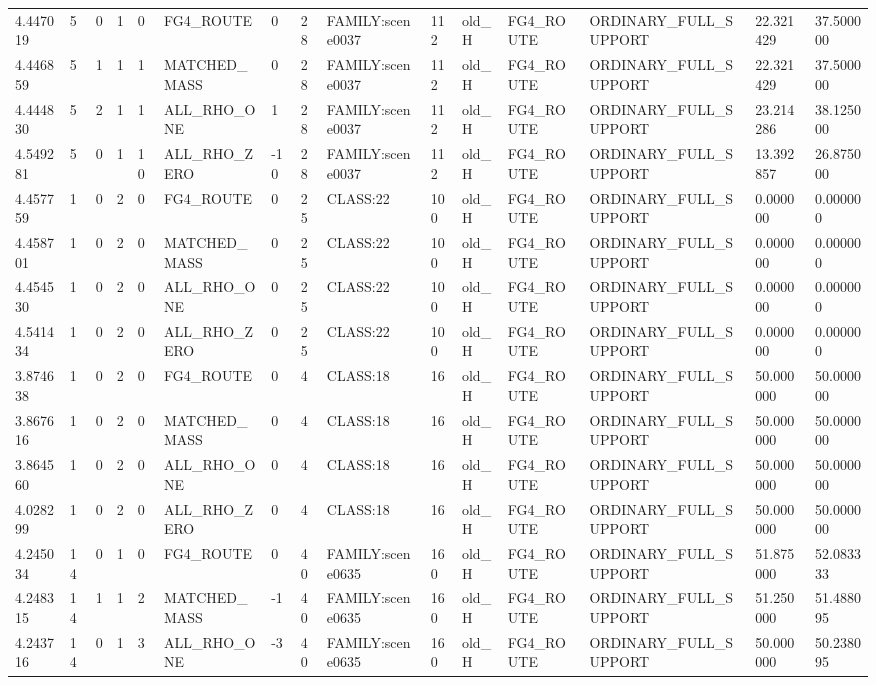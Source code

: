 \begin{tabular}{lllllllllllllll}
4.447019 & 5 & 0 & 1 & 0 & FG4\_ROUTE & 0 & 28 & FAMILY:scene0037 & 112 & old\_H & FG4\_ROUTE & ORDINARY\_FULL\_SUPPORT & 22.321429 & 37.500000 \\
4.446859 & 5 & 1 & 1 & 1 & MATCHED\_MASS & 0 & 28 & FAMILY:scene0037 & 112 & old\_H & FG4\_ROUTE & ORDINARY\_FULL\_SUPPORT & 22.321429 & 37.500000 \\
4.444830 & 5 & 2 & 1 & 1 & ALL\_RHO\_ONE & 1 & 28 & FAMILY:scene0037 & 112 & old\_H & FG4\_ROUTE & ORDINARY\_FULL\_SUPPORT & 23.214286 & 38.125000 \\
4.549281 & 5 & 0 & 1 & 10 & ALL\_RHO\_ZERO & -10 & 28 & FAMILY:scene0037 & 112 & old\_H & FG4\_ROUTE & ORDINARY\_FULL\_SUPPORT & 13.392857 & 26.875000 \\
4.457759 & 1 & 0 & 2 & 0 & FG4\_ROUTE & 0 & 25 & CLASS:22 & 100 & old\_H & FG4\_ROUTE & ORDINARY\_FULL\_SUPPORT & 0.000000 & 0.000000 \\
4.458701 & 1 & 0 & 2 & 0 & MATCHED\_MASS & 0 & 25 & CLASS:22 & 100 & old\_H & FG4\_ROUTE & ORDINARY\_FULL\_SUPPORT & 0.000000 & 0.000000 \\
4.454530 & 1 & 0 & 2 & 0 & ALL\_RHO\_ONE & 0 & 25 & CLASS:22 & 100 & old\_H & FG4\_ROUTE & ORDINARY\_FULL\_SUPPORT & 0.000000 & 0.000000 \\
4.541434 & 1 & 0 & 2 & 0 & ALL\_RHO\_ZERO & 0 & 25 & CLASS:22 & 100 & old\_H & FG4\_ROUTE & ORDINARY\_FULL\_SUPPORT & 0.000000 & 0.000000 \\
3.874638 & 1 & 0 & 2 & 0 & FG4\_ROUTE & 0 & 4 & CLASS:18 & 16 & old\_H & FG4\_ROUTE & ORDINARY\_FULL\_SUPPORT & 50.000000 & 50.000000 \\
3.867616 & 1 & 0 & 2 & 0 & MATCHED\_MASS & 0 & 4 & CLASS:18 & 16 & old\_H & FG4\_ROUTE & ORDINARY\_FULL\_SUPPORT & 50.000000 & 50.000000 \\
3.864560 & 1 & 0 & 2 & 0 & ALL\_RHO\_ONE & 0 & 4 & CLASS:18 & 16 & old\_H & FG4\_ROUTE & ORDINARY\_FULL\_SUPPORT & 50.000000 & 50.000000 \\
4.028299 & 1 & 0 & 2 & 0 & ALL\_RHO\_ZERO & 0 & 4 & CLASS:18 & 16 & old\_H & FG4\_ROUTE & ORDINARY\_FULL\_SUPPORT & 50.000000 & 50.000000 \\
4.245034 & 14 & 0 & 1 & 0 & FG4\_ROUTE & 0 & 40 & FAMILY:scene0635 & 160 & old\_H & FG4\_ROUTE & ORDINARY\_FULL\_SUPPORT & 51.875000 & 52.083333 \\
4.248315 & 14 & 1 & 1 & 2 & MATCHED\_MASS & -1 & 40 & FAMILY:scene0635 & 160 & old\_H & FG4\_ROUTE & ORDINARY\_FULL\_SUPPORT & 51.250000 & 51.488095 \\
4.243716 & 14 & 0 & 1 & 3 & ALL\_RHO\_ONE & -3 & 40 & FAMILY:scene0635 & 160 & old\_H & FG4\_ROUTE & ORDINARY\_FULL\_SUPPORT & 50.000000 & 50.238095 \\

\end{tabular}
